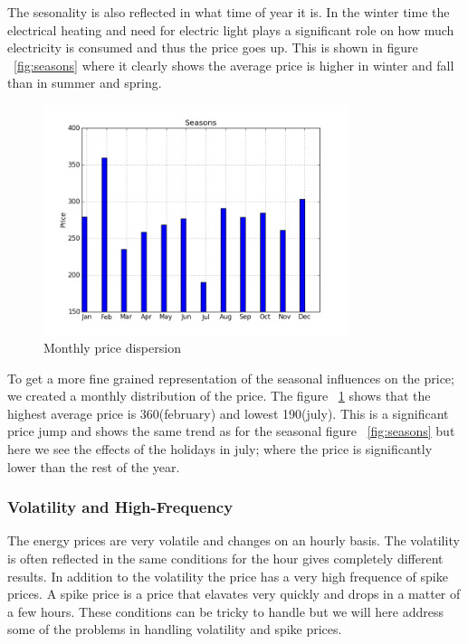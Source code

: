 The sesonality is also reflected in what time of year it is. In the winter time the electrical heating and need for electric light plays a significant role on how much electricity is consumed and thus the price goes up. This is shown in figure ~\ref{fig:seasons} where it clearly shows the average price is higher in winter and fall than in summer and spring.

\begin{figure}[H]
\centering
\includegraphics[width=0.8\textwidth ,natwidth=410,natheight=237]{billeder/energy_price_plots/averageMonthlyPrice.png}
\caption{Monthly price dispersion}
\label{fig:monthlyAveragePrice}
\end{figure}

To get a more fine grained representation of the seasonal influences on the price; we created a monthly distribution of the price. The figure ~\ref{fig:monthlyAveragePrice} shows that the highest average price is 360(february) and lowest 190(july). This is a significant price jump and shows the same trend as for the seasonal figure ~\ref{fig:seasons} but here we see the effects of the holidays in july; where the price is significantly lower than the rest of the year.

\subsubsection{Volatility and High-Frequency}
The energy prices are very volatile and changes on an hourly basis. The volatility is often reflected in the same conditions for the hour gives completely different results. In addition to the volatility the price has a very high frequence of spike prices. A spike price is a price that elavates very quickly and drops in a matter of a few hours. These conditions can be tricky to handle but we will here address some of the problems in handling volatility and spike prices.

